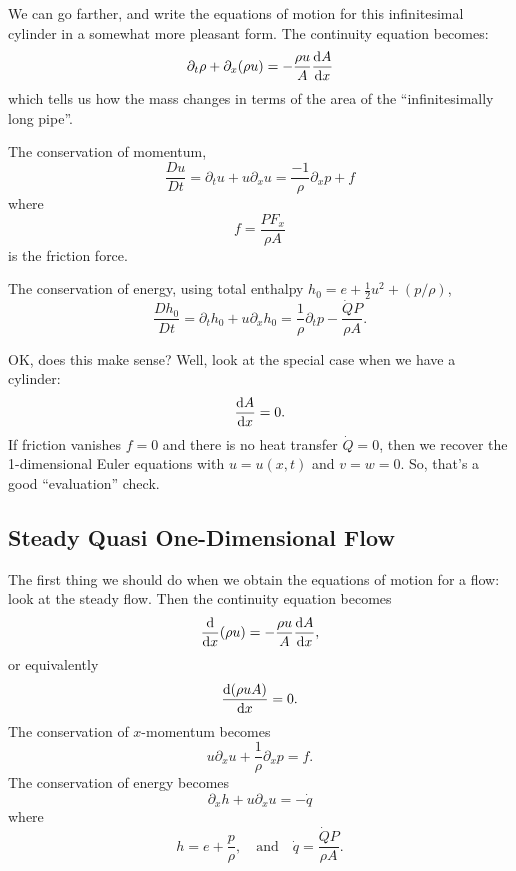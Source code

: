 \begin{node}
We can go farther, and write the equations of motion for this
infinitesimal cylinder in a somewhat more pleasant form. The
continuity equation becomes:
\begin{equation}
\partial_{t}\rho + \partial_{x}(\rho u) = -\frac{\rho u}{A}\frac{\mathrm{d} A}{\mathrm{d} x}
\end{equation}
which tells us how the mass changes in terms of the area of the
``infinitesimally long pipe''.

The conservation of momentum,
\begin{equation}
\frac{Du}{Dt}=\partial_{t}u+u\partial_{x}u=\frac{-1}{\rho}\partial_{x}p+f
\end{equation}
where
\begin{equation}
f = \frac{PF_{x}}{\rho A}
\end{equation}
is the friction force.

The conservation of energy, using total enthalpy $h_{0}=e+\frac{1}{2}u^{2}+(p/\rho)$,
\begin{equation}
\frac{Dh_{0}}{Dt}=\partial_{t}h_{0}+u\partial_{x}h_{0}=\frac{1}{\rho}\partial_{t}p-\frac{\dot{Q}P}{\rho A}.
\end{equation}
\end{node}

\begin{node}
OK, does this make sense? Well, look at the special case when we have
a cylinder:
\begin{equation}
\frac{\mathrm{d} A}{\mathrm{d} x}=0.
\end{equation}
If friction vanishes $f=0$ and there is no heat transfer $\dot{Q}=0$,
then we recover the 1-dimensional Euler equations with $u=u(x,t)$ and $v=w=0$.
So, that's a good ``evaluation'' check.
\end{node}

\subsection{Steady Quasi One-Dimensional Flow}

\begin{node}
The first thing we should do when we obtain the equations of motion
for a flow: look at the steady flow. Then the continuity equation
becomes
\begin{equation}
\frac{\mathrm{d}}{\mathrm{d} x}(\rho u)=-\frac{\rho u}{A}\frac{\mathrm{d} A}{\mathrm{d} x},
\end{equation}
or equivalently
\begin{equation}
\frac{\mathrm{d}(\rho u A)}{\mathrm{d} x}=0.
\end{equation}
The conservation of $x$-momentum becomes
\begin{equation}
u\partial_{x}u+\frac{1}{\rho}\partial_{x}p=f.
\end{equation}
The conservation of energy becomes
\begin{equation}
\partial_{x}h+u\partial_{x}u=-\dot{q}
\end{equation}
where
\begin{equation}
h=e+\frac{p}{\rho},\quad\mbox{and}\quad\dot{q}=\frac{\dot{Q}P}{\rho A}.
\end{equation}
\end{node}

